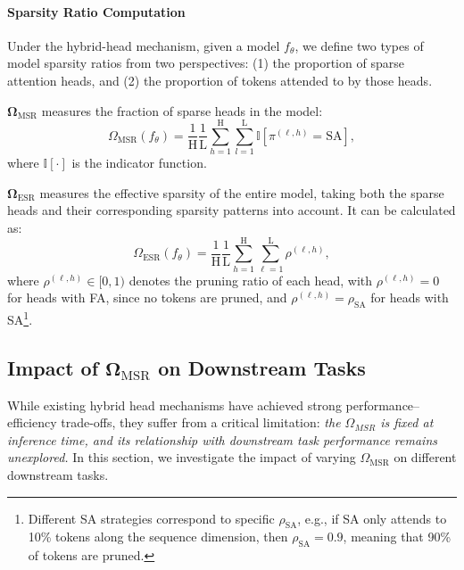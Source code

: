 \paragraph{Sparsity Ratio Computation}
Under the hybrid-head mechanism, given a model $f_{\theta}$, we define two types of model sparsity ratios from two perspectives: (1) the proportion of sparse attention heads, and (2) the proportion of tokens attended to by those heads.

\begin{definition}
$\mathbf{\Omega_{\mathrm{MSR}}}$ measures the fraction of sparse heads in the model:
\begin{equation}
\Omega_{\mathrm{MSR}}(f_{\theta})
= \frac{1}{\mathrm{H}}\frac{1}{\mathrm{L}}
\sum_{h=1}^{\mathrm{H}}\sum_{l=1}^{\mathrm{L}}
\mathbb{I}\!\left[\pi^{(\ell, h)}=\mathrm{SA}\right],
\end{equation}
where $\mathbb{I}[\cdot]$ is the indicator function.
\end{definition}

\begin{definition}
$\mathbf{\Omega_{\mathrm{ESR}}}$ measures the effective sparsity of the entire model, taking both the sparse heads and their corresponding sparsity patterns into account. It can be calculated as:
\begin{equation}
\Omega_{\mathrm{ESR}}(f_{\theta})
=
\frac{1}{\mathrm{H}}
\frac{1}{\mathrm{L}}
\sum_{h=1}^{\mathrm{H}}
\sum_{\ell=1}^{\mathrm{L}}
\rho^{(\mathrm{\ell}, h)},
\end{equation}
where $\rho^{(\ell, h)} \in [0,1)$ denotes the pruning ratio of each head, with $\rho^{(\ell, h)}=0$ for heads with FA, since no tokens are pruned, and $\rho^{(\ell, h)}=\rho_{\mathrm{SA}}$ for heads with SA\footnote{Different SA strategies correspond to specific $\rho_{\mathrm{SA}}$, e.g., if SA only attends to 10\% tokens along the sequence dimension, then $\rho_{\mathrm{SA}}=0.9$, meaning that 90\% of tokens are pruned.}.
\end{definition}

\subsection{Impact of $\mathbf{\Omega_\mathrm{MSR}}$ on Downstream Tasks}
\label{subsec:deployment_sparisity}
While existing hybrid head mechanisms have achieved strong performance–efficiency trade-offs, they suffer from a critical limitation: \emph{the $\mathit{\Omega_\mathit{MSR}}$ is fixed at inference time, and its relationship with downstream task performance remains unexplored.}
In this section, we investigate the impact of varying $\Omega_\mathrm{MSR}$ on different downstream tasks.

